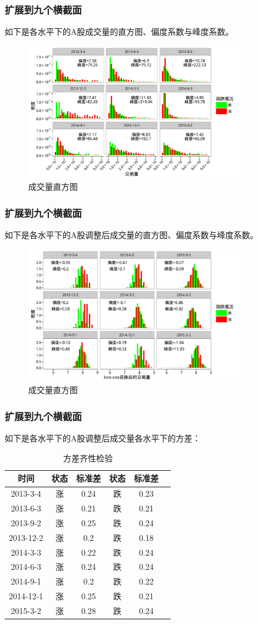 \documentclass[9pt]{beamer}
\begin{document}
\begin{frame}
\frametitle{扩展到九个横截面}
如下是各水平下的A股成交量的直方图、偏度系数与峰度系数。
\begin{figure}
\centering
\includegraphics[width=270pt]{成交量直方图.pdf}
\caption{成交量直方图}
\end{figure}
\end{frame}

\begin{frame}
\frametitle{扩展到九个横截面}
如下是各水平下的A股调整后成交量的直方图、偏度系数与峰度系数。
\begin{figure}
\centering
\includegraphics[width=270pt]{成交量直方图2.pdf}
\caption{成交量直方图}
\end{figure}
\end{frame}

\begin{frame}
\frametitle{扩展到九个横截面}
如下是各水平下的A股调整后成交量各水平下的方差：
\begin{table}
\centering
\caption{方差齐性检验}
\begin{tabular}{cccccc}
\hline
	时间&状态&标准差&状态&标准差\\\hline
	2013-3-4&涨&0.24&跌&0.23\\
	2013-6-3&涨&0.21&跌&0.21\\
	2013-9-2&涨&0.25&跌&0.24\\
	2013-12-2&涨&0.2&跌&0.18\\
	2014-3-3&涨&0.22&跌&0.24\\
	2014-6-3&涨&0.24&跌&0.24\\
	2014-9-1&涨&0.2&跌&0.22\\
	2014-12-1&涨&0.25&跌&0.21\\
	2015-3-2&涨&0.28&跌&0.24\\
	\hline
\end{tabular}
\end{table}
\end{frame}
\end{document}
